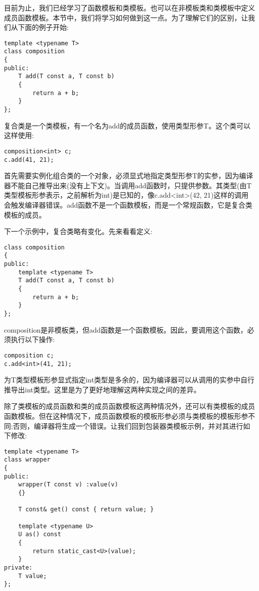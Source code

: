 目前为止，我们已经学习了函数模板和类模板。也可以在非模板类和类模板中定义成员函数模板。本节中，我们将学习如何做到这一点。为了理解它们的区别，让我们从下面的例子开始:

\begin{lstlisting}[style=styleCXX]
template <typename T>
class composition
{
public:
	T add(T const a, T const b)
	{
		return a + b;
	}
};
\end{lstlisting}

复合类是一个类模板，有一个名为add的成员函数，使用类型形参T。这个类可以这样使用:

\begin{lstlisting}[style=styleCXX]
composition<int> c;
c.add(41, 21);
\end{lstlisting}

首先需要实例化组合类的一个对象，必须显式地指定类型形参T的实参，因为编译器不能自己推导出来(没有上下文)。当调用add函数时，只提供参数。其类型(由T类型模板形参表示，之前解析为int)是已知的，像c.add<int>(42, 21)这样的调用会触发编译器错误。add函数不是一个函数模板，而是一个常规函数，它是复合类模板的成员。

下一个示例中，复合类略有变化。先来看看定义:

\begin{lstlisting}[style=styleCXX]
class composition
{
public:
	template <typename T>
	T add(T const a, T const b)
	{
		return a + b;
	}
};
\end{lstlisting}

composition是非模板类，但add函数是一个函数模板。因此，要调用这个函数，必须执行以下操作:

\begin{lstlisting}[style=styleCXX]
composition c;
c.add<int>(41, 21);
\end{lstlisting}

为T类型模板形参显式指定int类型是多余的，因为编译器可以从调用的实参中自行推导出int类型。这里是为了更好地理解这两种实现之间的差异。

除了类模板的成员函数和类的成员函数模板这两种情况外，还可以有类模板的成员函数模板。但在这种情况下，成员函数模板的模板形参必须与类模板的模板形参不同;否则，编译器将生成一个错误。让我们回到包装器类模板示例，并对其进行如下修改:

\begin{lstlisting}[style=styleCXX]
template <typename T>
class wrapper
{
public:
	wrapper(T const v) :value(v)
	{}
	
	T const& get() const { return value; }
	
	template <typename U>
	U as() const
	{
		return static_cast<U>(value);
	}
private:
	T value;
};
\end{lstlisting}

